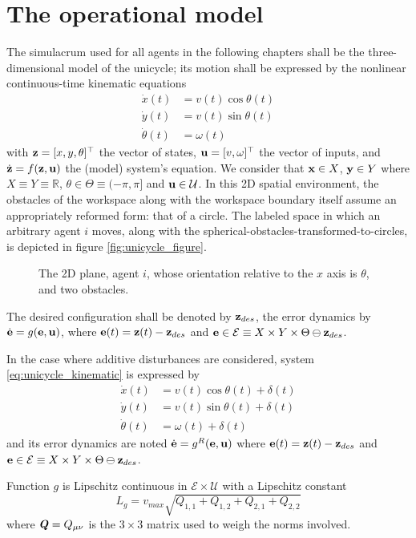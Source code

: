 \section{The operational model}

The simulacrum used for all agents in the following chapters shall be the
three-dimensional model of the unicycle; its motion shall be expressed by the
nonlinear continuous-time kinematic equations
\begin{align}
  \dot{x}(t)       &= v(t) \cos\theta(t) \\
  \dot{y}(t)       &= v(t) \sin\theta(t) \\
  \dot{\theta}(t)  &= \omega(t)
\label{eq:unicycle_kinematic}
\end{align}
with $\bm{\mathbf{z}} = [x,y,\theta]^{\top}$ the vector of states,
$\bm{\mathbf{u}} = [v, \omega]^{\top}$ the vector of inputs, and $\dot{\bm{\mathbf{z}}} =
f(\bm{\mathbf{z}}, \bm{\mathbf{u}})$ the (model) system's equation. We consider that
$\bm{\mathbf{x}} \in X$, $\bm{\mathbf{y}} \in Y$ where $X \equiv Y \equiv \mathbb{R}$,
$\theta \in \Theta \equiv (-\pi, \pi]$ and $\bm{\mathbf{u}} \in \mathcal{U}$.
In this 2D spatial environment, the obstacles of the workspace along with the
workspace boundary itself assume an appropriately reformed form: that of a
circle. The labeled space in which an arbitrary agent $i$ moves, along with the
spherical-obstacles-transformed-to-circles, is depicted in figure
\eqref{fig:unicycle_figure}.

\begin{figure}[H]\centering
  \scalebox{0.9}{}
  \caption{The 2D plane, agent $i$, whose orientation relative to the $x$
    axis is $\theta$, and two obstacles.}
  \label{fig:unicycle_figure}
\end{figure}
The desired configuration shall be denoted by $\bm{\mathbf{z}}_{des}$,
the error dynamics by $\dot{\bm{\mathbf{e}}} = g(\bm{\mathbf{e}}, \bm{\mathbf{u}})$,
where $\bm{\mathbf{e}}(t) = \bm{\mathbf{z}}(t) - \bm{\mathbf{z}}_{des}$ and
$\bm{\mathbf{e}} \in \mathcal{E} \equiv X \times Y \times \Theta \ominus \bm{\mathbf{z}}_{des}$.

In the case where additive disturbances are considered, system
\eqref{eq:unicycle_kinematic} is expressed by
\begin{align}
  \dot{x}(t)       &= v(t) \cos\theta(t) + \delta(t) \\
  \dot{y}(t)       &= v(t) \sin\theta(t) + \delta(t) \\
  \dot{\theta}(t)  &= \omega(t) + \delta(t)
\label{eq:unicycle_kinematic_with_disturbances}
\end{align}
and its error dynamics are noted $\dot{\bm{\mathbf{e}}} = g^R(\bm{\mathbf{e}}, \bm{\mathbf{u}})$
where $\bm{\mathbf{e}}(t) = \bm{\mathbf{z}}(t) - \bm{\mathbf{z}}_{des}$ and
$\bm{\mathbf{e}} \in \mathcal{E} \equiv X \times Y \times \Theta \ominus \bm{\mathbf{z}}_{des}$.

\begin{lemma}
  \label{lemma:lipschitz_unicycle}
  Function $g$ is Lipschitz continuous in $\mathcal{E} \times \mathcal{U}$ with
  a Lipschitz constant $$L_g = v_{max} \sqrt{Q_{1,1}+Q_{1,2}+Q_{2,1}+Q_{2,2}}$$
  where $\bm{\mathit{Q}} = Q_{\mu\nu}$ is the $3 \times 3$ matrix used to weigh the
  norms involved.
\end{lemma}
